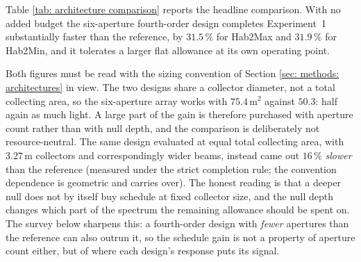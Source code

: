 \documentclass[12pt,a4paper]{article}
\numberwithin{equation}{section}
\numberwithin{figure}{section}
\numberwithin{table}{section}
\begin{document}
Table \ref{tab: architecture comparison} reports the headline comparison. With no added budget the six-aperture fourth-order design completes Experiment~1 substantially faster than the reference, by $31.5\,\%$ for Hab2Max and $31.9\,\%$ for Hab2Min, and it tolerates a larger flat allowance at its own operating point.

Both figures must be read with the sizing convention of Section \ref{sec: methods: architectures} in view. The two designs share a collector diameter, not a total collecting area, so the six-aperture array works with $75.4$\,m$^2$ against $50.3$: half again as much light. A large part of the gain is therefore purchased with aperture count rather than with null depth, and the comparison is deliberately not resource-neutral. The same design evaluated at equal total collecting area, with $3.27$\,m collectors and correspondingly wider beams, instead came out $16\,\%$ \textit{slower} than the reference (measured under the strict completion rule; the convention dependence is geometric and carries over). The honest reading is that a deeper null does not by itself buy schedule at fixed collector size, and the null depth changes which part of the spectrum the remaining allowance should be spent on. The survey below sharpens this: a fourth-order design with \emph{fewer} apertures than the reference can also outrun it, so the schedule gain is not a property of aperture count either, but of where each design's response puts its signal.
\end{document}
